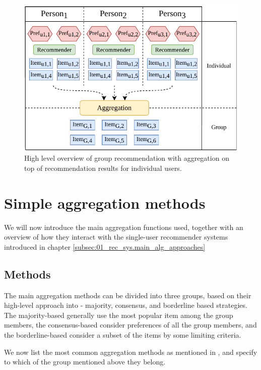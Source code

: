 \begin{figure}[htbp]
    \centering
    \includegraphics{img/after-rec-aggregation.pdf}
    \caption{High level overview of group recommendation with aggregation on top of recommendation results for individual users.}
    \label{fig:after_rec_agg}
\end{figure}






\section{Simple aggregation methods}\label{sec:03_simple_aggregation_metods}
We will now introduce the main aggregation functions used, together with an overview of how they interact with the single-user recommender systems introduced in chapter \ref{subsec:01_rec_sys.main_alg_approaches}
\subsection{Methods}\label{subsec:03_simple_aggregation_methods.methods}

The main aggregation methods can be divided into three groups, based on their high-level approach into - majority, consensus, and borderline based strategies. The majority-based generally use the most popular item among the group members, the consensus-based consider preferences of all the group members, and the borderline-based consider a subset of the items by some limiting criteria.

We now list the most common aggregation methods as mentioned in \cite{grouprecommendersystems_felfernig2018group}, \cite{masthoff_2011_group_rec_systems} and \cite{masthoff_2004_group_modeling} specify to which of the group mentioned above they belong.

